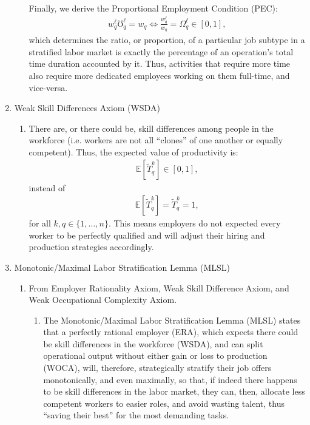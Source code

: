 \documentclass[hidelinks, nonatbib]{elsarticle}
\begin{document}
\begin{enumerate}
\begin{enumerate}
        Finally, we derive the Proportional Employment Condition (PEC):
        \begin{gather}
            w_{q}^{\ell}
            \mho_{q}^{\ell}
            =
            w_q
            \iff
            \frac{
                w_{q}^{\ell}
            }{
                w_q
            }
            =
            \Omega_{q}^{\ell}
            \in [0,1]
            ,
        \end{gather}
        which determines the ratio, or proportion, of a particular job subtype in a stratified labor market is exactly the percentage of an operation's total time duration accounted by it. Thus, activities that require more time also require more dedicated employees working on them full-time, and vice-versa.
    \end{enumerate}
    \item Weak Skill Differences Axiom (WSDA)
    \begin{enumerate}
        \item There are, or there could be, skill differences among people in the workforce (i.e. workers are not all ``clones'' of one another or equally competent). Thus, the expected value of productivity is:
        \begin{gather}
            \mathbb{E}[
                \tilde{T}_{q}^{k}
            ]
            \in
            [0,1]
            ,
        \end{gather}
        instead of 
        \begin{gather}
            \mathbb{E}[
                \tilde{T}_{q}^{k}
            ]
            =
            \tilde{T}_{q}^{k}
            = 1
            ,
        \end{gather}
        for all $k,q \in \{1, \dots, n\}$. This means employers do not expected every worker to be perfectly qualified and will adjust their hiring and production strategies accordingly.
    \end{enumerate}
    \item Monotonic/Maximal Labor Stratification Lemma (MLSL)
    \begin{enumerate}
        \item From Employer Rationality Axiom, Weak Skill Difference Axiom, and Weak Occupational Complexity Axiom.
        \begin{enumerate}
            \item The Monotonic/Maximal Labor Stratification Lemma (MLSL) states that a perfectly rational employer (ERA), which expects there could be skill differences in the workforce (WSDA), and can split operational output without either gain or loss to production (WOCA), will, therefore, strategically stratify their job offers monotonically, and even maximally, so that, if indeed there happens to be skill differences in the labor market, they can, then, allocate less competent workers to easier roles, and avoid wasting talent, thus ``saving their best'' for the most demanding tasks.
            

\end{enumerate}
\end{enumerate}
\end{enumerate}
\end{document}

